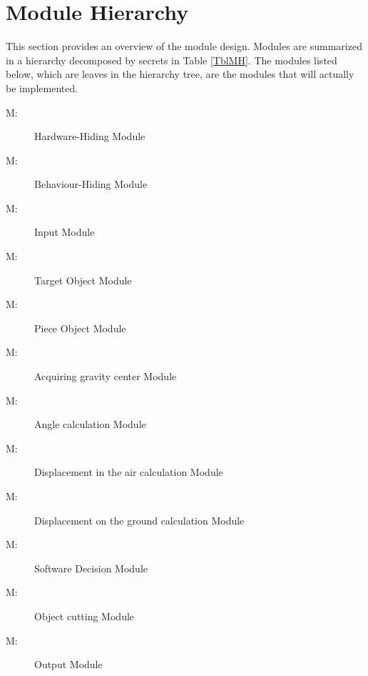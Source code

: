 \documentclass[12pt, titlepage]{article}
\newcounter{mnum}
\newcommand{\mthemnum}{M\themnum}
\begin{document}
	
	\section{Module Hierarchy} \label{SecMH}
	
	This section provides an overview of the module design. Modules are summarized
	in a hierarchy decomposed by secrets in Table \ref{TblMH}. The modules listed
	below, which are leaves in the hierarchy tree, are the modules that will
	actually be implemented.
	
	\begin{description}
		\item [ \mthemnum \label{mHH}:] Hardware-Hiding Module
		\item [ \mthemnum \label{mBH}:] Behaviour-Hiding Module
		\item [ \mthemnum \label{mIF}:] Input Module
		\item [ \mthemnum \label{mTO}:] Target Object Module
		\item [ \mthemnum \label{mPO}:] Piece Object Module
		\item [ \mthemnum \label{mOGC}:] Acquiring gravity center Module
		\item [ \mthemnum \label{mAC}:] Angle calculation Module
		\item [ \mthemnum \label{mDC1}:] Displacement in the air calculation Module
		\item [ \mthemnum \label{mDC2}:] Displacement on the ground calculation Module
		\item [ \mthemnum \label{mSD}:] Software Decision Module
		\item [ \mthemnum \label{mOC}:] Object cutting Module
		\item [ \mthemnum \label{mOM}:] Output Module
	\end{description}
	
\end{document}
